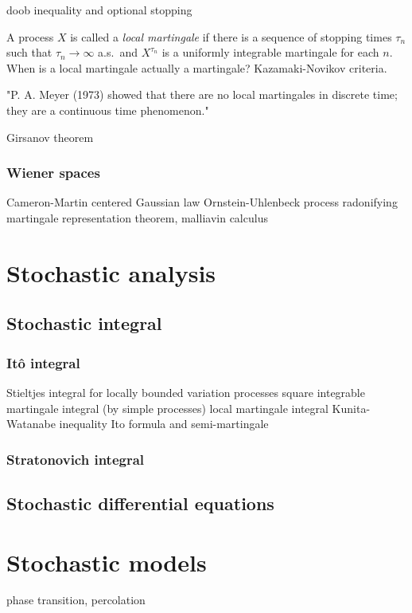 \documentclass{../../large}
\begin{document}
doob inequality and optional stopping


\begin{prb}
A process $X$ is called a \emph{local martingale} if there is a sequence of stopping times $\tau_n$ such that $\tau_n\to\infty$ a.s.~and $X^{\tau_n}$ is a uniformly integrable martingale for each $n$.
When is a local martingale actually a martingale?
Kazamaki-Novikov criteria.
\end{prb}
"P. A. Meyer (1973) showed that there are no local martingales in discrete time; they are a continuous time phenomenon."

\begin{prb}
\end{prb}




\begin{prb}
\end{prb}

Girsanov theorem




\section{Wiener spaces}
Cameron-Martin
centered Gaussian law
Ornstein-Uhlenbeck process
radonifying
martingale representation theorem, malliavin calculus




\part{Stochastic analysis}

\chapter{Stochastic integral}
\section{It\^o integral}
Stieltjes integral for locally bounded variation processes
square integrable martingale integral (by simple processes)
local martingale integral
Kunita-Watanabe inequality
Ito formula and semi-martingale

\section{Stratonovich integral}


\chapter{Stochastic differential equations}
\chapter{}



\part{Stochastic models}

phase transition, percolation
\end{document}
